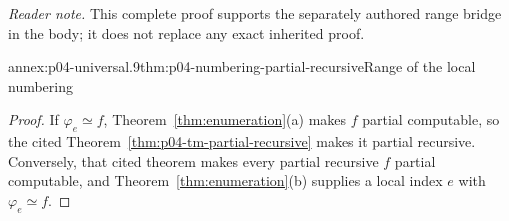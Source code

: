 
\noindent\textit{Reader note.}
This complete proof supports the separately authored range bridge in the body;
it does not replace any exact inherited proof.

\begin{annexitem}{annex:p04-universal.9}{thm:p04-numbering-partial-recursive}{Range of the local numbering}
\begin{proof}
If \(\varphi_e\simeq f\), Theorem~\ref{thm:enumeration}(a) makes \(f\)
partial computable, so the cited Theorem~\ref{thm:p04-tm-partial-recursive}
makes it partial recursive.  Conversely, that cited theorem makes every
partial recursive \(f\) partial computable, and
Theorem~\ref{thm:enumeration}(b) supplies a local index \(e\) with
\(\varphi_e\simeq f\).
\end{proof}
\end{annexitem}

